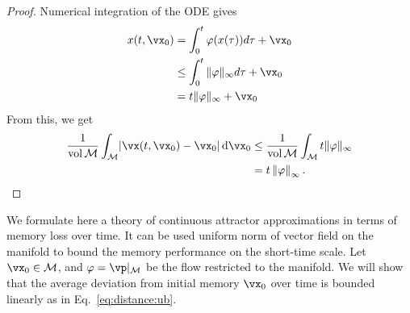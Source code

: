 \documentclass{article} %
\newcounter{ct}
\newcommand{\dm}[1]{\ensuremath{\mathrm{d}{#1}}} %
\newcommand{\manifold}{\mathcal{M}}
\newcommand{\uniformNorm}[1]{\left\|#1\right\|_\infty} %
\DeclarePairedDelimiter{\abs}{\lvert}{\rvert}
\theoremstyle{definition}
\theoremstyle{remark}
\begin{document}
\begin{proof}
Numerical integration of the ODE gives
\begin{align*}
x(t,\vx_{0}) &= \int_{0}^{t}\varphi(x(\tau))d\tau + \vx_{0} \\
&\leq \int_{0}^{t}\|\varphi\|_{\infty} d\tau + \vx_{0} \\
&= t\|\varphi\|_{\infty}+ \vx_{0}
\end{align*}From this, we get
\begin{align*}
\frac{1}{\operatorname{vol}\manifold}\int_{\manifold}
\abs{\vx(t, \vx_{0}) - \vx_{0}}\,
\dm{\vx_{0}} & \leq \frac{1}{\operatorname{vol}\manifold}\int_{\manifold} t\|\varphi\|_{\infty}\\
&= t\uniformNorm{\varphi}.
\end{align*}\end{proof}



We formulate here a theory of continuous attractor approximations in terms of memory loss over time.
It can be used uniform norm of vector field on the manifold to bound the memory performance on the short-time scale. %
Let \(\vx_{0} \in \manifold\), and \(\varphi = \vp\vert_{\manifold}\) be the flow restricted to the manifold.
We will show that the average deviation from initial memory \(\vx_{0}\) over time is bounded linearly as in Eq.~\ref{eq:distance:ub}.
\end{document}
